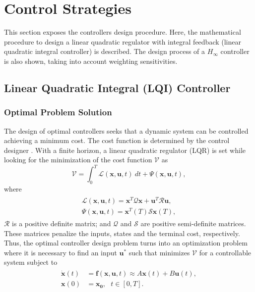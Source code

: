 \section{Control Strategies}
\label{sec:controlstrategies}
This section exposes the controllers design procedure. Here, the mathematical procedure to design a linear quadratic regulator with integral feedback (linear quadratic integral controller) is described. The design process of a $H_{\infty}$ controller is also shown, taking into account weighting sensitivities.

\subsection{Linear Quadratic Integral (LQI) Controller}
\subsubsection{Optimal Problem Solution}
The design of optimal controllers seeks that a dynamic system can be controlled achieving a minimum cost. The cost function is determined by the control designer \cite{Steinbuch2007}. With a finite horizon, a linear quadratic regulator (LQR) is set while looking for the minimization of the cost function $\mathcal{V}$ as
\begin{equation}
\label{eqn:cost}
\mathcal{V} = \int_{0}^{T}\mathcal{L}(\mathbf{x},\mathbf{u},t)\ dt + \Psi(\mathbf{x},\mathbf{u},t),
\end{equation}
where
\begin{align}
\begin{split}
\mathcal{L}(\mathbf{x},\mathbf{u},t) = \mathbf{x}^{T}\mathcal{Q}\mathbf{x} + \mathbf{u}^{T}\mathcal{R}\mathbf{u},\\[5px]
\Psi(\mathbf{x},\mathbf{u},t) = \mathbf{x}^{T}(T)\mathcal{S}\mathbf{x}(T),
\end{split}
\end{align}
$\mathcal{R}$ is a positive definite matrix; and $\mathcal{Q}$ and $\mathcal{S}$ are positive semi-definite matrices. These matrices penalize the inputs, states and the terminal cost, respectively. Thus, the optimal controller design problem turns into an optimization problem where it is necessary to find an input $\mathbf{u}^{*}$ such that minimizes $\mathcal{V}$ for a controllable system subject to
\begin{align}
\begin{split}
\dot{\mathbf{x}}(t) & = \mathbf{f}(\mathbf{x}, \mathbf{u}, t) \approx A\mathbf{x}(t)+B\mathbf{u}(t),\\[5px]
\mathbf{x}(0) & = \mathbf{x_0},\ \ \ t \in [0, T].
\end{split}
\end{align}
